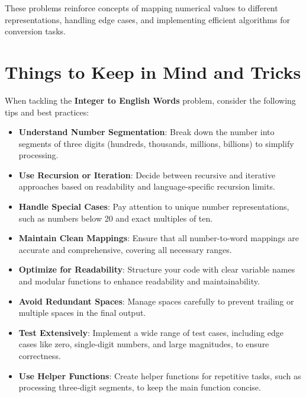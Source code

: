 These problems reinforce concepts of mapping numerical values to different representations, handling edge cases, and implementing efficient algorithms for conversion tasks.

\section*{Things to Keep in Mind and Tricks}

When tackling the \textbf{Integer to English Words} problem, consider the following tips and best practices:

\begin{itemize}
    \item \textbf{Understand Number Segmentation}: Break down the number into segments of three digits (hundreds, thousands, millions, billions) to simplify processing.
    
    \item \textbf{Use Recursion or Iteration}: Decide between recursive and iterative approaches based on readability and language-specific recursion limits.
    
    \item \textbf{Handle Special Cases}: Pay attention to unique number representations, such as numbers below 20 and exact multiples of ten.
    
    \item \textbf{Maintain Clean Mappings}: Ensure that all number-to-word mappings are accurate and comprehensive, covering all necessary ranges.
    
    \item \textbf{Optimize for Readability}: Structure your code with clear variable names and modular functions to enhance readability and maintainability.
    
    \item \textbf{Avoid Redundant Spaces}: Manage spaces carefully to prevent trailing or multiple spaces in the final output.
    
    \item \textbf{Test Extensively}: Implement a wide range of test cases, including edge cases like zero, single-digit numbers, and large magnitudes, to ensure correctness.
    
    \item \textbf{Use Helper Functions}: Create helper functions for repetitive tasks, such as processing three-digit segments, to keep the main function concise.
    

\end{itemize}
